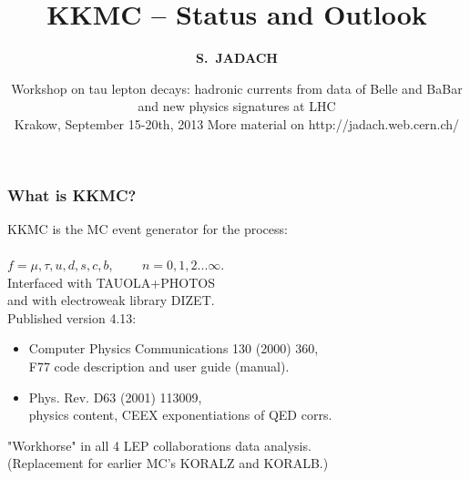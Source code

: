 \documentclass{beamer}
\title[Monte Carlo Methods] %
{ {\bf KKMC -- Status and Outlook}
} %
\author[S.~Jadach] %
{\Large\bf S.~JADACH }
\institute[Universities of Somewhere and Elsewhere] %
{ {\large\crd IFJ-PAN, Krak\'ow, Poland}\\
  {~~~}\\
  {\footnotesize
  Partly supported by Polish Government grant\\
  {\em Narodowe Centrum Nauki} DEC-2011/03/B/ST2/02632
}}
\date[Short Occasion] %
{\small Workshop on 
   tau lepton decays: hadronic currents from data of  Belle and BaBar 
   and new physics signatures at LHC\\
   Krakow,
   September 15-20th, 2013
\vskip 4mm
 \footnotesize
  More material on
  http://jadach.web.cern.ch/
}
\begin{document}
\begin{frame}
  \titlepage
\end{frame}


\begin{frame}[fragile]
\frametitle{\bf What is KKMC?}
\large
KKMC is the MC event generator for the process:\\
~~~~~~~~~~~~~~\\
$f=\mu,\tau,u,d,s,c,b$,~~~~ $n=0,1,2...\infty$.\\
Interfaced with TAUOLA+PHOTOS\\
and with electroweak library DIZET.\\

Published version 4.13:
\begin{itemize}
\item
Computer Physics Communications 130 (2000) 360,\\
F77 code description and user guide (manual).
\item
Phys. Rev. D63 (2001) 113009,\\
physics content, CEEX exponentiations of QED corrs.\\
\end{itemize}
"Workhorse" in all 4 LEP collaborations data analysis.\\
\small
(Replacement for earlier MC's KORALZ and KORALB.)

\end{frame}
\end{document}
